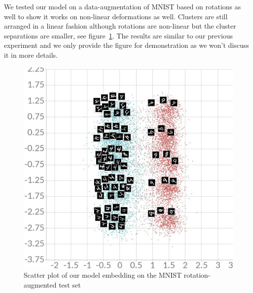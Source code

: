 \documentclass[a4paper,12pt]{report}
\begin{document}
We tested our model on a data-augmentation of MNIST based on rotations as well to show it works on non-linear deformations as well.
Clusters are still arranged in a linear fashion although rotations are non-linear but the cluster separations are smaller, see figure~\ref{fig:mnist_cl2d_rotate}.
The results are similar to our previous experiment and we only provide the figure for demonstration as we won't discuss it in more details.

\begin{figure}[h]
    \begin{center}
        \includegraphics{thesis_figures/mnist_cl2d_rotate.jpg}
    \end{center}
    \caption{Scatter plot of our model embedding on the MNIST rotation-augmented test set}
    \label{fig:mnist_cl2d_rotate}
\end{figure}
\end{document}
